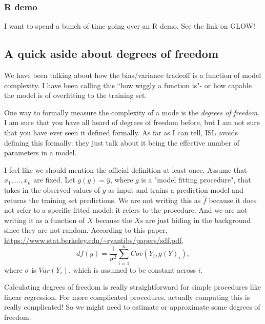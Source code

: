 \subsubsection{R demo}

I want to spend a bunch of time going over an R demo. See the link on GLOW! 


\subsection{A quick aside about degrees of freedom}

We have been talking about how the bias/variance tradeoff is a function of model complexity. I have been calling this ``how wiggly a function is"- or how capable the model is of overfitting to the training set. 

One way to formally measure the complexity of a mode is the \emph{degrees of freedom}. I am sure that you have all heard of degrees of freedom before, but I am not sure that you have ever seen it defined formally. As far as I can tell, ISL avoids defining this formally: they just talk about it being the effective number of parameters in a model. 

I feel like we should mention the official definition at least once. Assume that $x_1,\ldots,x_n$ are fixed. Let $g(y) = \hat{y}$, where $g$ is a "model fitting procedure", that takes in the observed values of $y$ as input and trains a prediction model and returns the training set predictions. We are not writing this as $\hat{f}$ because it does not refer to a specific fitted model: it refers to the procedure. And we are not writing it as a function of $X$ because the $X$s are just hiding in the background since they are not random. According to this paper, \url{https://www.stat.berkeley.edu/~ryantibs/papers/sdf.pdf}, 
$$
df(g) = \frac{1}{\sigma^2} \sum_{i=1}^n Cov(Y_i, g(Y)_i),
$$
where $\sigma$ is $Var(Y_i)$, which is assumed to be constant across $i$. 

Calculating degrees of freedom is really straightforward for simple procedures like linear regression. For more complicated procedures, actually computing this is really complicated! So we might need to estimate or approximate some degrees of freedom. 

